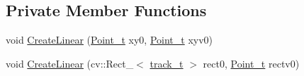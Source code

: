 \subsection*{Private Member Functions}
\begin{DoxyCompactItemize}
\item 
void \mbox{\hyperlink{class_t_kalman_filter_a6b1bb8fb881f82ce0a766e6ea41f159c}{Create\+Linear}} (\mbox{\hyperlink{defines_8h_a8c42696da8f098b91374a8e8bb84b430}{Point\+\_\+t}} xy0, \mbox{\hyperlink{defines_8h_a8c42696da8f098b91374a8e8bb84b430}{Point\+\_\+t}} xyv0)
\item 
void \mbox{\hyperlink{class_t_kalman_filter_a1141fb38b6e9bfb1bef0d16686569978}{Create\+Linear}} (cv\+::\+Rect\+\_\+$<$ \mbox{\hyperlink{defines_8h_a7ce9c8817b42ab418e61756f579549ab}{track\+\_\+t}} $>$ rect0, \mbox{\hyperlink{defines_8h_a8c42696da8f098b91374a8e8bb84b430}{Point\+\_\+t}} rectv0)
\end{DoxyCompactItemize}
